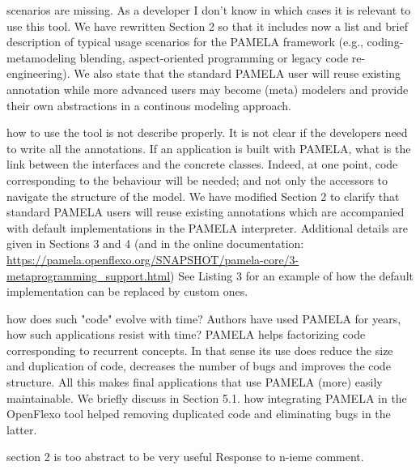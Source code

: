 \documentclass[10pt]{article}
\begin{document}
\pagebreak

\begin{response}{scenarios are missing. As a developer I don't know in which cases it is relevant to use this tool.}
We have rewritten Section 2 so that it includes now a list and brief description of typical usage scenarios for the PAMELA framework (e.g., coding-metamodeling blending, aspect-oriented programming or legacy code re-engineering). We also state that the standard PAMELA user will reuse existing annotation while more advanced users may become (meta) modelers and provide their own abstractions in a continous modeling approach. 
\end{response}


\begin{response}{how to use the tool is not describe properly. It is not clear if the developers need to write all the annotations. If an application is built with PAMELA, what is the link between the interfaces and the concrete classes. Indeed, at one point, code corresponding to the behaviour will be needed; and not only the accessors to navigate the structure of the model.}
We have modified Section 2 to clarify that standard PAMELA users will reuse existing annotations which are accompanied with default implementations in the PAMELA interpreter. Additional details are given in Sections 3 and 4 (and in the online documentation: \url{https://pamela.openflexo.org/SNAPSHOT/pamela-core/3-metaprogramming_support.html}) See Listing 3 for an example of how the default implementation can be replaced by custom ones.
\end{response}

\begin{response}{how does such "code" evolve with time? Authors have used PAMELA for years, how such applications resist with time?}
PAMELA helps factorizing code corresponding to recurrent concepts. In that sense its use does reduce the size and duplication of code, decreases the number of bugs and improves the code structure. All this makes final applications that use PAMELA (more) easily maintainable.
We briefly discuss in Section 5.1. how integrating PAMELA in the OpenFlexo tool helped removing duplicated code and eliminating bugs in the latter.
\end{response}

\begin{response}{section 2 is too abstract to be very useful}
  Response to n-ieme comment.
\end{response}
\end{document}
